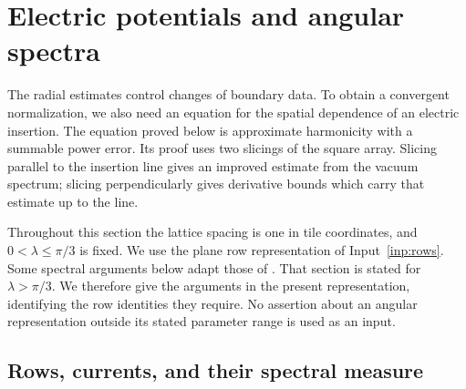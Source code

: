 \section{Electric potentials and angular spectra}\label{sec:spectral}

The radial estimates control changes of boundary data.  To obtain a
convergent normalization, we also need an equation for the spatial
dependence of an electric insertion.  The equation proved below is
approximate harmonicity with a summable power error.  Its proof uses
two slicings of the square array.  Slicing parallel to the insertion
line gives an improved estimate from the vacuum spectrum; slicing
perpendicularly gives derivative bounds which carry that estimate up
to the line.

Throughout this section the lattice spacing is one in tile
coordinates, and $0<\lambda\le\pi/3$ is fixed.  We use the plane row
representation of Input~\ref{inp:rows}.  Some spectral arguments below
adapt those of \cite[Section~4, ``Finite inner functions and a measure
on dilation orbits'' and ``The height variogram'']{GFFCompanion}.
That section is stated for $\lambda>\pi/3$.  We therefore give the
arguments in the present representation, identifying the row
identities they require.  No assertion about an angular representation
outside its stated parameter range is used as an input.

\subsection{Rows, currents, and their spectral measure}

